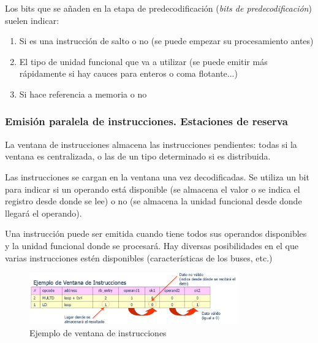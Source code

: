 \documentclass[10pt,a4paper,spanish]{report}
\begin{document}
Los bits que se añaden en la etapa de predecodificación (\textit{\textcolor{azul}{bits de predecodificación}}) suelen indicar:
\begin{enumerate}[\color{azul}{$\heartsuit$}]
    \item Si es una instrucción de salto o no (se puede empezar su procesamiento antes)
    \item El tipo de unidad funcional que va a utilizar (se puede emitir más rápidamente si hay cauces para enteros o coma flotante...)
    \item Si hace referencia a memoria o no
\end{enumerate}

\textcolor{azul}{\subsubsection{Emisión paralela de instrucciones. Estaciones de reserva}}
La ventana de instrucciones almacena las instrucciones pendientes: todas si la ventana es centralizada, o las de un tipo determinado si es distribuida.

Las instrucciones se cargan en la ventana una vez decodificadas. Se utiliza un bit para indicar si un operando está disponible (se almacena el valor o se indica el registro desde donde se lee) o no (se almacena la unidad funcional desde donde llegará el operando).

Una instrucción puede ser emitida cuando tiene todos sus operandos disponibles y la unidad funcional donde se procesará. Hay diversas posibilidades en el que varias instrucciones estén disponibles (características de los buses, etc.)

\begin{figure}[!h]
\centering
\includegraphics[width=0.8\textwidth]{85}
\caption{Ejemplo de ventana de instrucciones}
\label{ventana}
\end{figure}
\end{document}
